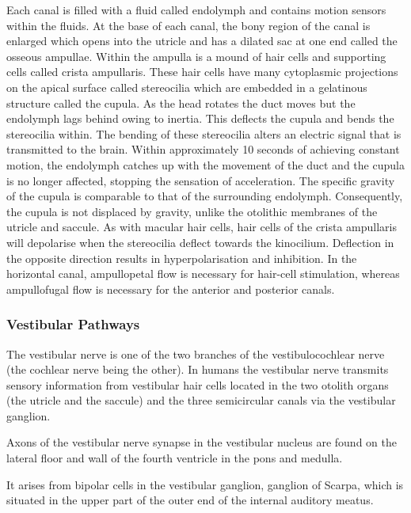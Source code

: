 Each canal is filled with a fluid called endolymph and contains motion
sensors within the fluids. At the base of each canal, the bony region of
the canal is enlarged which opens into the utricle and has a dilated sac
at one end called the osseous ampullae. Within the ampulla is a mound of
hair cells and supporting cells called crista ampullaris. These hair
cells have many cytoplasmic projections on the apical surface called
stereocilia which are embedded in a gelatinous structure called the
cupula. As the head rotates the duct moves but the endolymph lags behind
owing to inertia. This deflects the cupula and bends the stereocilia
within. The bending of these stereocilia alters an electric signal that
is transmitted to the brain. Within approximately 10 seconds of
achieving constant motion, the endolymph catches up with the movement of
the duct and the cupula is no longer affected, stopping the sensation of
acceleration. The specific gravity of the cupula is comparable to that
of the surrounding endolymph. Consequently, the cupula is not displaced
by gravity, unlike the otolithic membranes of the utricle and saccule.
As with macular hair cells, hair cells of the crista ampullaris will
depolarise when the stereocilia deflect towards the kinocilium.
Deflection in the opposite direction results in hyperpolarisation and
inhibition. In the horizontal canal, ampullopetal flow is necessary for
hair-cell stimulation, whereas ampullofugal flow is necessary for the
anterior and posterior canals.

\hypertarget{vestibular-pathways}{%
\subsubsection{Vestibular Pathways}\label{vestibular-pathways}}

The vestibular nerve is one of the two branches of the vestibulocochlear
nerve (the cochlear nerve being the other). In humans the vestibular
nerve transmits sensory information from vestibular hair cells located
in the two otolith organs (the utricle and the saccule) and the three
semicircular canals via the vestibular ganglion.

Axons of the vestibular nerve synapse in the vestibular nucleus are
found on the lateral floor and wall of the fourth ventricle in the pons
and medulla.

It arises from bipolar cells in the vestibular ganglion, ganglion of
Scarpa, which is situated in the upper part of the outer end of the
internal auditory meatus.

